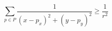 \documentclass{article}
\begin{document}
    \[
    \sum_{p \in P} \frac{1}{(x - p_x)^2 + (y - p_y)^2} \geq \frac{1}{r^2}
    \]
\end{document}
